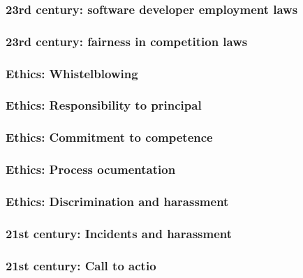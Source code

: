 \begin{frame}[fragile]
\frametitle{23rd century: software developer employment laws}

\end{frame}

\begin{frame}[fragile]
\frametitle{23rd century: fairness in competition laws}

\end{frame}

\begin{frame}[fragile]
\frametitle{Ethics: Whistelblowing}

\end{frame}

\begin{frame}[fragile]
\frametitle{Ethics: Responsibility to principal}

\end{frame}

\begin{frame}[fragile]
\frametitle{Ethics: Commitment to competence}

\end{frame}

\begin{frame}[fragile]
\frametitle{Ethics: Process ocumentation}

\end{frame}

\begin{frame}[fragile]
\frametitle{Ethics: Discrimination and harassment}

\end{frame}

\begin{frame}[fragile]
\frametitle{21st century: Incidents and harassment}

\end{frame}

\begin{frame}[fragile]
\frametitle{21st century: Call to actio}

\end{frame}


